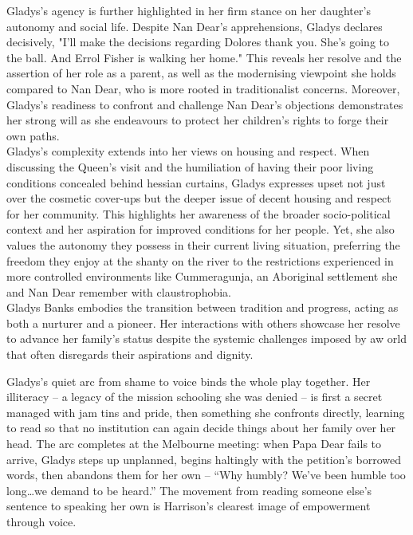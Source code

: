 \documentclass[a4paper]{article}
\begin{document}
Gladys's agency is further highlighted in her firm stance on her
daughter's
autonomy
and social life. Despite Nan Dear's
apprehensions, Gladys declares decisively,
"I’ll make the
decisions regarding Dolores thank you. She’s going to the ball.
And Errol Fisher is walking her home."
This reveals her resolve
and the assertion of her role as a parent, as well as the
modernising viewpoint she holds compared to Nan Dear, who is
more rooted in traditionalist concerns. Moreover, Gladys's
readiness to confront and challenge Nan Dear's objections
demonstrates her strong will as she endeavours to protect her
children's rights to forge their own paths.\\

Gladys's complexity extends into her views on housing and
respect. When discussing the Queen's visit and the humiliation of having their poor living conditions concealed behind hessian curtains, Gladys expresses upset not just over the cosmetic cover-ups but the deeper issue of decent housing and respect for her community. This highlights her awareness of the broader socio-political context and her aspiration for improved conditions for her people. Yet, she also values the autonomy they possess in their current living situation, preferring the freedom they enjoy at the shanty on the river to the restrictions experienced in more controlled environments like Cummeragunja, an Aboriginal settlement she and Nan Dear remember with claustrophobia.\\

Gladys Banks embodies the transition between tradition and progress, acting as both a nurturer and a pioneer. Her interactions with others showcase her resolve to advance her family's status despite the systemic challenges imposed by aw orld that often disregards their aspirations and dignity.



Gladys's quiet arc from shame to voice binds the whole play together. Her illiteracy -- a legacy of the mission schooling she was denied -- is first a secret managed with jam tins and pride, then something she confronts directly, learning to read so that no institution can again decide things about her family over her head. The arc completes at the Melbourne meeting: when Papa Dear fails to arrive, Gladys steps up unplanned, begins haltingly with the petition's borrowed words, then abandons them for her own -- ``Why humbly? We've been humble too long\ldots we demand to be heard.'' The movement from reading someone else's sentence to speaking her own is Harrison's clearest image of empowerment through voice.\\
\end{document}
